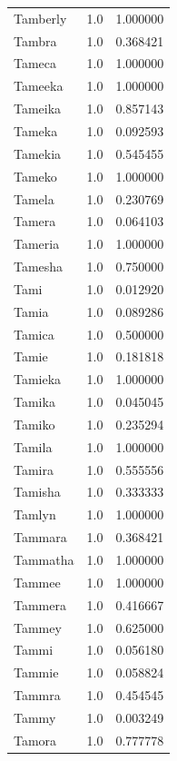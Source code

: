 \documentclass[
  letterpaper,
  DIV=11,
  numbers=noendperiod]{scrreprt}
\begin{document}
\begin{tabular}{lrr}
Tamberly        &   1.0 &   1.000000 \\
Tambra          &   1.0 &   0.368421 \\
Tameca          &   1.0 &   1.000000 \\
Tameeka         &   1.0 &   1.000000 \\
Tameika         &   1.0 &   0.857143 \\
Tameka          &   1.0 &   0.092593 \\
Tamekia         &   1.0 &   0.545455 \\
Tameko          &   1.0 &   1.000000 \\
Tamela          &   1.0 &   0.230769 \\
Tamera          &   1.0 &   0.064103 \\
Tameria         &   1.0 &   1.000000 \\
Tamesha         &   1.0 &   0.750000 \\
Tami            &   1.0 &   0.012920 \\
Tamia           &   1.0 &   0.089286 \\
Tamica          &   1.0 &   0.500000 \\
Tamie           &   1.0 &   0.181818 \\
Tamieka         &   1.0 &   1.000000 \\
Tamika          &   1.0 &   0.045045 \\
Tamiko          &   1.0 &   0.235294 \\
Tamila          &   1.0 &   1.000000 \\
Tamira          &   1.0 &   0.555556 \\
Tamisha         &   1.0 &   0.333333 \\
Tamlyn          &   1.0 &   1.000000 \\
Tammara         &   1.0 &   0.368421 \\
Tammatha        &   1.0 &   1.000000 \\
Tammee          &   1.0 &   1.000000 \\
Tammera         &   1.0 &   0.416667 \\
Tammey          &   1.0 &   0.625000 \\
Tammi           &   1.0 &   0.056180 \\
Tammie          &   1.0 &   0.058824 \\
Tammra          &   1.0 &   0.454545 \\
Tammy           &   1.0 &   0.003249 \\
Tamora          &   1.0 &   0.777778 \\

\end{tabular}
\end{document}
